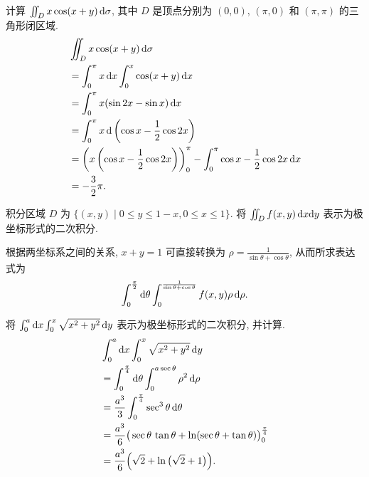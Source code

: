 \documentclass[a4paper,10pt,fleqn]{article}
\begin{document}
\begin{exmp}
    计算 $\iint_Dx\cos(x+y)\,{\rm d}\sigma$, 其中 $D$ 是顶点分别为 $(0,0)$, $(\pi,0)$ 和 $(\pi,\pi)$ 的三角形闭区域.
    \begin{align*}
         & \iint_Dx\cos(x+y)\,{\rm d}\sigma                                                                        \\
         & =\int_0^\pi x\,{\rm d}x\int_0^x\cos(x+y)\,{\rm d}x                                                      \\
         & =\int_0^\pi x(\sin 2x-\sin x)\,{\rm d}x                                                                 \\
         & = \int_0^\pi x\,{\rm d}\left(\cos x-\frac{1}{2}\cos2x\right)                                            \\
         & =\left(x\left(\cos x-\frac{1}{2}\cos2x\right)\right)_0^\pi-\int_0^\pi\cos x-\frac{1}{2}\cos2x\,{\rm d}x \\
         & =-\frac{3}{2}\pi.
    \end{align*}
\end{exmp}

\begin{exmp}
    积分区域 $D$ 为 $\big\{(x,y)\mid0\leq y\leq1-x,0\leq x\leq1\big\}$. 将 $\iint_Df(x,y)\,{\rm d}x{\rm d}y$
    表示为极坐标形式的二次积分.

    根据两坐标系之间的关系, $x+y=1$ 可直接转换为 $\rho=\frac{1}{\sin\theta+\cos\theta}$, 从而所求表达式为
    \[
        \int_0^{\frac{\pi}{2}}{\rm d}\theta\int_0^{\frac{1}{\sin\theta+\cos\theta}}f(x,y)\rho\,{\rm d}\rho.
    \]
\end{exmp}

\pagebreak

\begin{exmp}
    将 $\int_0^a{\rm d}x\int_0^x\sqrt{x^2+y^2}\,{\rm d}y$ 表示为极坐标形式的二次积分, 并计算.
    \begin{align*}
         & \int_0^a{\rm d}x\int_0^x\sqrt{x^2+y^2}\,{\rm d}y                                            \\
         & =\int_0^{\frac{\pi}{4}}{\rm d}\theta\int_0^{a\sec\theta}\rho^2\,{\rm d}\rho                 \\
         & =\frac{a^3}{3}\int_0^{\frac{\pi}{4}}\sec^3\theta\,{\rm d}\theta                             \\
         & =\frac{a^3}{6}\big(\sec\theta\,\tan\theta+\ln(\sec\theta+\tan\theta)\big)_0^{\frac{\pi}{4}} \\
         & =\frac{a^3}{6}\Big(\sqrt{2}+\ln\big(\sqrt{2}+1\big)\Big).
    \end{align*}
\end{exmp}
\end{document}
